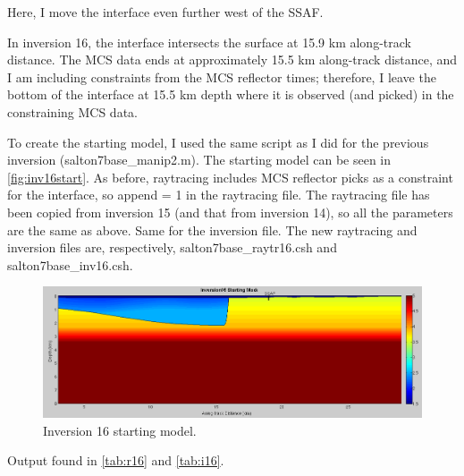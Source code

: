 \documentclass[fontsize=11pt, %
                             paper=a4, %
                             twoside, %
                             captions=tableheading,
                             index=totoc,
                             hyperref]{labbook}
\begin{document}
\begin{addmargin}[4cm]{0cm}
Here, I move the interface even further west of the SSAF.

In inversion 16, the interface intersects the surface at 15.9 km along-track distance.  The MCS data ends at approximately 15.5 km along-track distance, and I am including constraints from the MCS reflector times; therefore, I leave the bottom of the interface at 15.5 km depth where it is observed (and picked) in the constraining MCS data.  

To create the starting model, I used the same script as I did for the previous inversion (salton7base\_manip2.m).  The starting model can be seen in \autoref{fig:inv16start}.  As before, raytracing includes MCS reflector picks as a constraint for the interface, so append = 1 in the raytracing file.  The raytracing file has been copied from inversion 15 (and that from inversion 14), so all the parameters are the same as above.  Same for the inversion file.  The new raytracing and inversion files are, respectively, salton7base\_raytr16.csh and salton7base\_inv16.csh.  


\begin{figure}[h!]
\raggedleft
\includegraphics[scale=0.35,keepaspectratio=true]{figs/Inv16_0.png}
\caption{Inversion 16 starting model.}
\label{fig:inv16start}
\end{figure}

Output found in \autoref{tab:r16} and \autoref{tab:i16}.


\end{addmargin}
\end{document}
